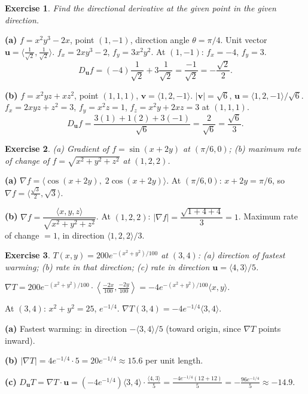 \documentclass[12pt,a4paper]{article}
\theoremstyle{exstyle}
\newtheorem{exercise}{Exercise}[section]
\newcommand{\grad}{\nabla}
\begin{document}
\begin{exercise}
Find the directional derivative at the given point in the given direction.
\end{exercise}
\begin{solbox}
\textbf{(a)} $f=x^2y^3-2x$, point $(1,-1)$, direction angle $\theta=\pi/4$.
Unit vector $\mathbf{u}=\langle\tfrac{1}{\sqrt{2}},\tfrac{1}{\sqrt{2}}\rangle$.
$f_x=2xy^3-2$, $f_y=3x^2y^2$. At $(1,-1)$: $f_x=-4$, $f_y=3$.
\[
  D_{\mathbf{u}}f=(-4)\frac{1}{\sqrt{2}}+3\frac{1}{\sqrt{2}}=\frac{-1}{\sqrt{2}}=-\frac{\sqrt{2}}{2}.
\]

\textbf{(b)} $f=x^2yz+xz^2$, point $(1,1,1)$, $\mathbf{v}=\langle1,2,-1\rangle$.
$|\mathbf{v}|=\sqrt{6}$, $\mathbf{u}=\langle1,2,-1\rangle/\sqrt{6}$.
$f_x=2xyz+z^2=3$, $f_y=x^2z=1$, $f_z=x^2y+2xz=3$ at $(1,1,1)$.
\[
  D_{\mathbf{u}}f=\frac{3(1)+1(2)+3(-1)}{\sqrt{6}}=\frac{2}{\sqrt{6}}=\frac{\sqrt{6}}{3}.
\]
\end{solbox}

\begin{exercise}
(a) Gradient of $f=\sin(x+2y)$ at $(\pi/6,0)$;
(b) maximum rate of change of $f=\sqrt{x^2+y^2+z^2}$ at $(1,2,2)$.
\end{exercise}
\begin{solbox}
\textbf{(a)} $\grad f=\langle\cos(x+2y),\;2\cos(x+2y)\rangle$.
At $(\pi/6,0)$: $x+2y=\pi/6$, so $\grad f=\bigl\langle\tfrac{\sqrt{3}}{2},\sqrt{3}\bigr\rangle$.

\textbf{(b)} $\grad f=\dfrac{\langle x,y,z\rangle}{\sqrt{x^2+y^2+z^2}}$.
At $(1,2,2)$: $|\grad f|=\dfrac{\sqrt{1+4+4}}{3}=1$.
Maximum rate of change $=1$, in direction $\langle1,2,2\rangle/3$.
\end{solbox}

\begin{exercise}
$T(x,y)=200e^{-(x^2+y^2)/100}$ at $(3,4)$:
(a) direction of fastest warming; (b) rate in that direction;
(c) rate in direction $\mathbf{u}=\langle4,3\rangle/5$.
\end{exercise}
\begin{solbox}
$\grad T=200e^{-(x^2+y^2)/100}\cdot\left\langle\frac{-2x}{100},\frac{-2y}{100}\right\rangle
=-4e^{-(x^2+y^2)/100}\langle x,y\rangle$.

At $(3,4)$: $x^2+y^2=25$, $e^{-1/4}$.
$\grad T(3,4)=-4e^{-1/4}\langle3,4\rangle$.

\textbf{(a)} Fastest warming: in direction $-\langle3,4\rangle/5$ (toward origin, since $\grad T$ points inward).

\textbf{(b)} $|\grad T|=4e^{-1/4}\cdot5=20e^{-1/4}\approx15.6$ per unit length.

\textbf{(c)} $D_{\mathbf{u}}T=\grad T\cdot\mathbf{u}=(-4e^{-1/4})\langle3,4\rangle\cdot\frac{\langle4,3\rangle}{5}
=\frac{-4e^{-1/4}(12+12)}{5}=-\frac{96e^{-1/4}}{5}\approx-14.9$.
\end{solbox}
\end{document}
